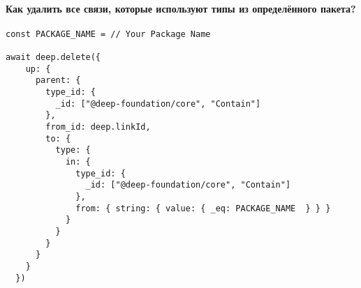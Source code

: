\paragraph{Как удалить все связи, которые используют типы из определённого пакета?}
\begin{verbatim}
const PACKAGE_NAME = // Your Package Name

await deep.delete({
    up: {
      parent: {
        type_id: {
          _id: ["@deep-foundation/core", "Contain"]
        },
        from_id: deep.linkId,
        to: {
          type: {
            in: {
              type_id: {
                _id: ["@deep-foundation/core", "Contain"]
              },
              from: { string: { value: { _eq: PACKAGE_NAME  } } }
            }
          }
        }
      }
    }
  })
\end{verbatim}
